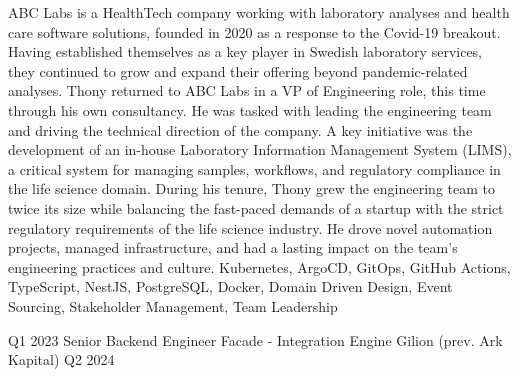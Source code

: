 \begin{experiences}
{        ABC Labs is a HealthTech company working with laboratory analyses and health care software solutions, founded in 2020 as a response to the Covid-19 breakout.
        Having established themselves as a key player in Swedish laboratory services, they continued to grow and expand their offering beyond pandemic-related analyses.
        \newline \newline
        Thony returned to ABC Labs in a VP of Engineering role, this time through his own consultancy.
        He was tasked with leading the engineering team and driving the technical direction of the company.
        A key initiative was the development of an in-house Laboratory Information Management System (LIMS), a critical system for managing samples, workflows, and regulatory compliance in the life science domain.
        \newline \newline
        During his tenure, Thony grew the engineering team to twice its size while balancing the fast-paced demands of a startup with the strict regulatory requirements of the life science industry.
        He drove novel automation projects, managed infrastructure, and had a lasting impact on the team's engineering practices and culture.
        \newline
    }
    {Kubernetes, ArgoCD, GitOps, GitHub Actions, TypeScript, NestJS, PostgreSQL, Docker, Domain Driven Design, Event Sourcing, Stakeholder Management, Team Leadership}
    \emptySeparator

    \experience
    {Q1 2023}
    {Senior Backend Engineer}
    {Facade - Integration Engine}
    {Gilion (prev. Ark Kapital)}
    {Q2 2024} {
    
}
\end{experiences}
